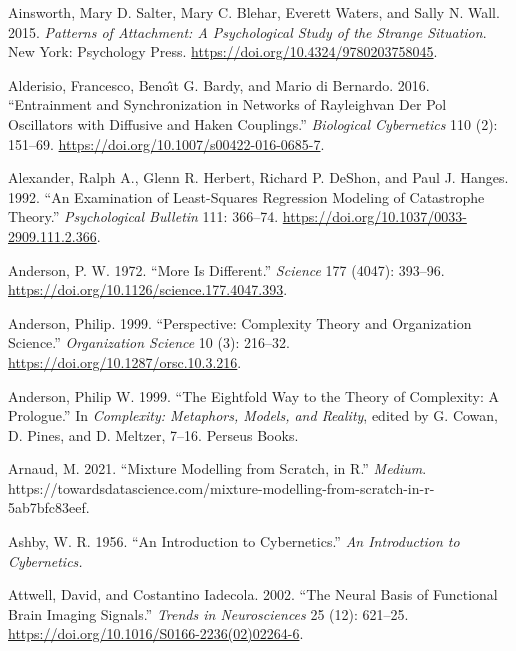 \documentclass[
  a4paper,
  DIV=11,
  numbers=noendperiod,
  oneside]{scrreprt}
\newlength{\cslhangindent}
\newenvironment{CSLReferences}[2] %
 {\begin{list}{}{%
  \setlength{\itemindent}{0pt}
  \setlength{\leftmargin}{0pt}
  \setlength{\parsep}{0pt}
  \ifodd #1
   \setlength{\leftmargin}{\cslhangindent}
   \setlength{\itemindent}{-1\cslhangindent}
  \fi
  \setlength{\itemsep}{#2\baselineskip}}}
 {\end{list}}
\begin{document}
\begin{CSLReferences}{1}{0}
Ainsworth, Mary D. Salter, Mary C. Blehar, Everett Waters, and Sally N.
Wall. 2015. \emph{Patterns of {Attachment}: {A Psychological Study} of
the {Strange Situation}}. {New York}: {Psychology Press}.
\url{https://doi.org/10.4324/9780203758045}.

Alderisio, Francesco, Benoı̂t G. Bardy, and Mario di Bernardo. 2016.
{``Entrainment and Synchronization in Networks of
{Rayleigh}\textendash van Der {Pol} Oscillators with Diffusive and
{Haken} Couplings.''}
\emph{Biological Cybernetics} 110 (2): 151--69.
\url{https://doi.org/10.1007/s00422-016-0685-7}.

Alexander, Ralph A., Glenn R. Herbert, Richard P. DeShon, and Paul J.
Hanges. 1992. {``An Examination of Least-Squares Regression Modeling of
Catastrophe Theory.''} \emph{Psychological Bulletin} 111: 366--74.
\url{https://doi.org/10.1037/0033-2909.111.2.366}.

Anderson, P. W. 1972. {``More {Is Different}.''} \emph{Science} 177
(4047): 393--96. \url{https://doi.org/10.1126/science.177.4047.393}.

Anderson, Philip. 1999. {``Perspective: {Complexity Theory} and
{Organization Science}.''} \emph{Organization Science} 10 (3): 216--32.
\url{https://doi.org/10.1287/orsc.10.3.216}.

Anderson, Philip W. 1999. {``The {Eightfold Way} to the {Theory} of
{Complexity}: {A Prologue}.''} In \emph{Complexity: Metaphors, Models,
and Reality}, edited by G. Cowan, D. Pines, and D. Meltzer, 7--16.
{Perseus Books}.

Arnaud, M. 2021. {``Mixture Modelling from Scratch, in {R}.''}
\emph{Medium}.
https://towardsdatascience.com/mixture-modelling-from-scratch-in-r-5ab7bfc83eef.

Ashby, W. R. 1956. {``An Introduction to Cybernetics.''} \emph{An
Introduction to Cybernetics.}

Attwell, David, and Costantino Iadecola. 2002. {``The Neural Basis of
Functional Brain Imaging Signals.''} \emph{Trends in Neurosciences} 25
(12): 621--25. \url{https://doi.org/10.1016/S0166-2236(02)02264-6}.


\end{CSLReferences}
\end{document}

